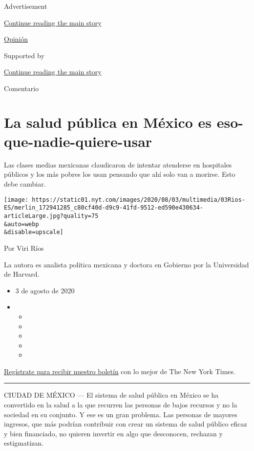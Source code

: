 Advertisement

\protect\hyperlink{after-top}{Continue reading the main story}

\href{/es/section/opinion}{Opinión}

Supported by

\protect\hyperlink{after-sponsor}{Continue reading the main story}

Comentario

\hypertarget{la-salud-puxfablica-en-muxe9xico-es-eso-que-nadie-quiere-usar}{%
\section{La salud pública en México es
eso-que-nadie-quiere-usar}\label{la-salud-puxfablica-en-muxe9xico-es-eso-que-nadie-quiere-usar}}

Las clases medias mexicanas claudicaron de intentar atenderse en
hospitales públicos y los más pobres los usan pensando que ahí solo van
a morirse. Esto debe cambiar.

\texttt{[image: https://static01.nyt.com/images/2020/08/03/multimedia/03Rios-ES/merlin\_172941285\_c80cf40d-d9c9-41fd-9512-ed590e430634-articleLarge.jpg?quality=75\\\&auto=webp\\\&disable=upscale]}

Por Viri Ríos

La autora es analista política mexicana y doctora en Gobierno por la
Universidad de Harvard.

\begin{itemize}
\item
  3 de agosto de 2020
\item
  \begin{itemize}
  \item
  \item
  \item
  \item
  \item
  \end{itemize}
\end{itemize}

\href{https://www.nytimes.com/newsletters/el-times}{Regístrate para
recibir nuestro boletín} con lo mejor de The New York Times.

\begin{center}\rule{0.5\linewidth}{\linethickness}\end{center}

CIUDAD DE MÉXICO --- El sistema de salud pública en México se ha
convertido en la salud a la que recurren las personas de bajos recursos
y no la sociedad en su conjunto. Y ese es un gran problema. Las personas
de mayores ingresos, que más podrían contribuir con crear un sistema de
salud público eficaz y bien financiado, no quieren invertir en algo que
desconocen, rechazan y estigmatizan.

